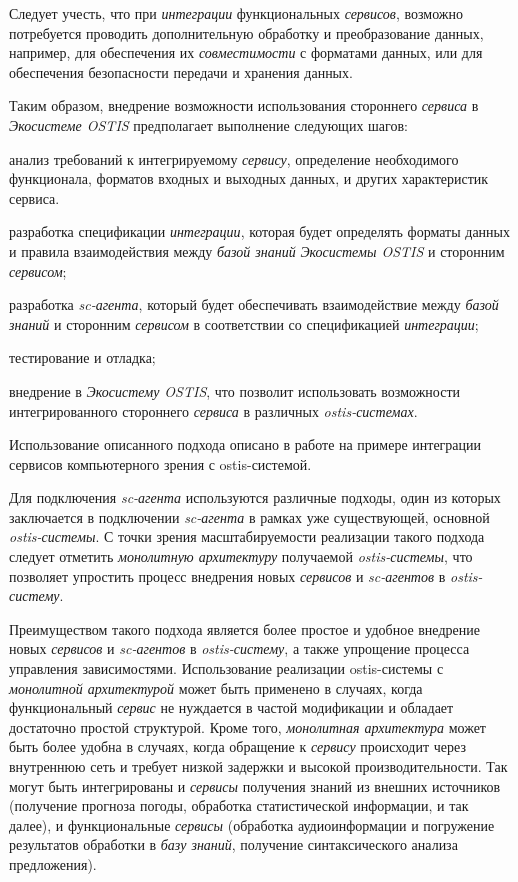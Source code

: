 Следует учесть, что при \textit{интеграции} функциональных \textit{сервисов}, возможно потребуется проводить дополнительную обработку и преобразование данных, например, для обеспечения их \textit{совместимости} с форматами данных, или для обеспечения безопасности передачи и хранения данных.

Таким образом, внедрение возможности использования стороннего \textit{сервиса} в \textit{Экосистеме OSTIS} предполагает выполнение следующих шагов:
\begin{textitemize}
    \item анализ требований к интегрируемому \textit{сервису}, определение необходимого функционала, форматов входных и выходных данных, и других характеристик сервиса.
    \item разработка спецификации \textit{интеграции}, которая будет определять форматы данных и правила взаимодействия между \textit{базой знаний} \textit{Экосистемы OSTIS} и сторонним \textit{сервисом};
    \item разработка \textit{sc-агента}, который будет обеспечивать взаимодействие между \textit{базой знаний} и сторонним \textit{сервисом} в соответствии со спецификацией \textit{интеграции};
    \item тестирование и отладка;
    \item внедрение в \textit{Экосистему OSTIS}, что позволит использовать возможности интегрированного стороннего \textit{сервиса} в различных \textit{ostis-системах}.
\end{textitemize}

Использование описанного подхода описано в работе  на примере интеграции сервисов компьютерного зрения с ostis-системой. 

Для подключения \textit{sc-агента} используются различные подходы, один из которых заключается в подключении \textit{sc-агента} в рамках уже существующей, основной \textit{ostis-системы}. С точки зрения масштабируемости реализации такого подхода следует отметить \textit{монолитную архитектуру} получаемой \textit{ostis-системы}, что позволяет упростить процесс внедрения новых \textit{сервисов} и \textit{sc-агентов} в \textit{ostis-систему}.

Преимуществом такого подхода является более простое и удобное внедрение новых \textit{сервисов} и \textit{sc-агентов} в \textit{ostis-систему}, а также упрощение процесса управления зависимостями. Использование реализации ostis-системы с \textit{монолитной архитектурой} может быть применено в случаях, когда функциональный \textit{сервис} не нуждается в частой модификации и обладает достаточно простой структурой. Кроме того, \textit{монолитная архитектура} может быть более удобна в случаях, когда обращение к \textit{сервису} происходит через внутреннюю сеть и требует низкой задержки и высокой производительности. Так могут быть интегрированы и \textit{сервисы} получения знаний из внешних источников (получение прогноза погоды, обработка статистической информации, и так далее), и функциональные \textit{сервисы} (обработка аудиоинформации и погружение результатов обработки в \textit{базу знаний}, получение синтаксического анализа предложения). 

